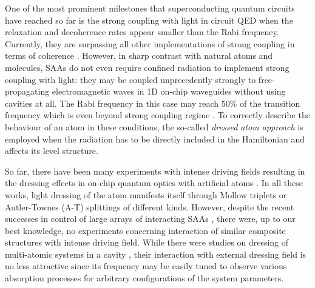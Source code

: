 \documentclass[%
 aps, prx,
 amsmath,amssymb,
 reprint,%
superscriptaddress
]{revtex4-2}
\begin{document}
One of the most prominent milestones that 
superconducting quantum circuits have reached so 
far is the strong coupling with light in {circuit 
QED} \cite{wallraff2004strong, 
chiorescu2004coherent} when the relaxation and decoherence rates 
appear smaller than the Rabi frequency. 
Currently, they are surpassing all other 
implementations of strong coupling in terms of 
coherence \cite{forn2019ultrastrong}. 
However, in sharp contrast with natural atoms and 
molecules, SAAs do not even require confined 
radiation to implement strong coupling with 
light: they may be coupled unprecedently strongly 
to free-propagating electromagnetic waves in 1D 
on-chip waveguides \cite{astafiev2010resonance} 
without using cavities at all. The Rabi frequency 
in this case may reach 50\% of the transition 
frequency \cite{deng2015observation} which is even 
beyond strong coupling 
regime \cite{forn2019ultrastrong}. To correctly 
describe the behaviour of an atom in these 
conditions, the so-called \textit{dressed atom 
approach} \cite{cohen1998atom} is employed when 
the radiation has to be directly included in the 
Hamiltonian and affects its level structure.

So far, there have been many experiments with intense driving fields resulting in the dressing effects in on-chip quantum optics with artificial 
atoms \cite{baur2009measurement, 
sillanpaa2009autler, astafiev2010resonance, 
novikov2013autler, suri2013observation, 
koshino2013observation, 
braumuller2015multiphoton, peng2018vacuum, 
gasparinetti2019two}. In all these works, light 
dressing of the atom manifests itself through 
Mollow triplets or Autler-Townes (A-T) splittings of 
different kinds. However, despite the recent 
successes in control of large arrays of 
interacting SAAs \cite{Song574, ye2019propagation, 
arute2019quantum}, there were, up to our best 
knowledge, no experiments concerning interaction 
of similar composite structures with intense driving field. While there were studies on dressing 
of multi-atomic systems in a 
cavity \cite{fink2009dressed, 
macha2014implementation, shulga2017observation, 
yang2018probing}, their interaction with external dressing field is no less attractive since its 
frequency may be easily tuned to observe various 
absorption processes for arbitrary configurations 
of the system parameters.
\end{document}
